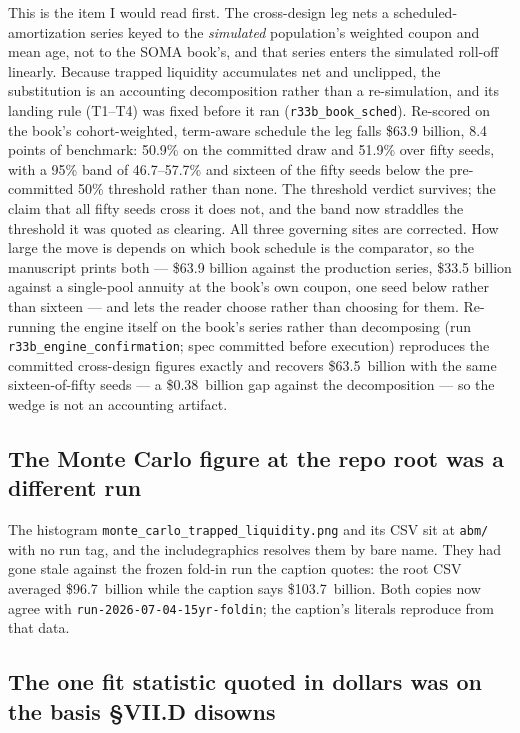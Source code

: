 \documentclass[11pt]{article}
\newcommand{\run}[1]{\texttt{#1}}
\begin{document}
This is the item I would read first. The cross-design leg nets a scheduled-amortization
series keyed to the \emph{simulated} population's weighted coupon and mean age, not to
the SOMA book's, and that series enters the simulated roll-off linearly. Because trapped
liquidity accumulates net and unclipped, the substitution is an accounting decomposition
rather than a re-simulation, and its landing rule (T1--T4) was fixed before it ran
(\run{r33b\_book\_sched}). Re-scored on the book's cohort-weighted, term-aware schedule
the leg falls \$63.9 billion, 8.4 points of benchmark: 50.9\% on the committed draw and
51.9\% over fifty seeds, with a 95\% band of 46.7--57.7\% and sixteen of the fifty seeds
below the pre-committed 50\% threshold rather than none. The threshold verdict survives;
the claim that all fifty seeds cross it does not, and the band now straddles the
threshold it was quoted as clearing. All three governing sites are corrected. How large
the move is depends on which book schedule is the comparator, so the manuscript prints
both --- \$63.9 billion against the production series, \$33.5 billion against a
single-pool annuity at the book's own coupon, one seed below rather than sixteen --- and
lets the reader choose rather than choosing for them.
Re-running the engine itself on the book's series rather than decomposing
(run \texttt{r33b\_engine\_confirmation}; spec committed before execution)
reproduces the committed cross-design figures exactly and recovers
\$63.5~billion with the same sixteen-of-fifty seeds --- a \$0.38~billion
gap against the decomposition --- so the wedge is not an accounting artifact.

\subsection{The Monte Carlo figure at the repo root was a different run}

The histogram \texttt{monte\_carlo\_trapped\_liquidity.png} and its CSV sit at
\texttt{abm/} with no run tag, and the includegraphics resolves them by bare
name. They had gone stale against the frozen fold-in run the caption quotes:
the root CSV averaged \$96.7~billion while the caption says \$103.7~billion.
Both copies now agree with \texttt{run-2026-07-04-15yr-foldin}; the caption's
literals reproduce from that data.

\subsection{The one fit statistic quoted in dollars was on the basis \S VII.D disowns}
\end{document}
